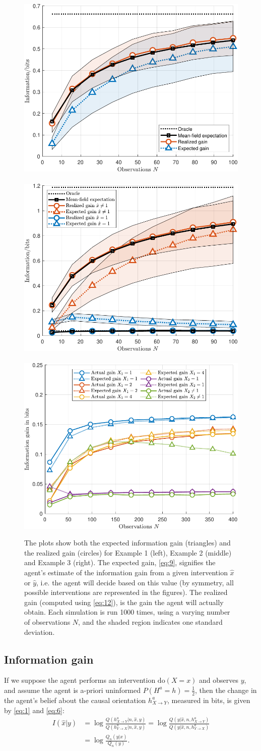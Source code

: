 \documentclass[letterpaper]{article} %
\newcommand{\doo}{\textrm{do}}
\begin{document}
	\begin{figure}[t!]
		\centering
		\includegraphics[width=.33\linewidth]{diag-crop}~
		\includegraphics[width=.33\linewidth]{single-crop}~
		\includegraphics[width=.33\linewidth]{multi-crop}		
		\caption{The plots show both the expected information gain (triangles) and the realized gain (circles) for Example 1 (left), Example 2 (middle) and Example 3 (right). The expected gain, \cref{eq:9}, signifies the agent's estimate of the information gain from a given intervention $\hat x$ or $\hat y$, i.e. the agent will decide based on this value (by symmetry, all possible interventions are represented in the figures). The realized gain (computed using  \cref{eq:12}), is the gain the agent will actually obtain. Each simulation is run 1000 times, using a varying number of observations $N$, and the shaded region indicates one standard deviation. }\label{fig3}
	\end{figure}
	
	
\subsection{Information gain}
If we suppose the agent performs an intervention $\doo(X=x)$ and observes $y$, and assume the agent is a-priori uninformed $P(H^a=h) = \frac{1}{2}$, then the change in the agent's belief about the causal orientation $h^a_{X\rightarrow Y}$, measured in bits, is given by \cref{eq:1} and \cref{eq:6}: %
\begin{align}
I(\hat x | y) & = 
\log \frac{Q( h^a_{X \rightarrow Y} | n, \hat x, y ) }{ Q( h^a_{Y \rightarrow X} | n, \hat x, y ) } 
 = \log \frac{ Q(y | \hat x, n, h^a_{X\rightarrow Y} ) }
{ Q(y | \hat x, n, h^a_{ Y \rightarrow X} ) } \nonumber \\
& = \log \frac{ Q_n(y | x)  }
{ Q_n(y ) }.  \label{eq:6}
\end{align}
\end{document}
